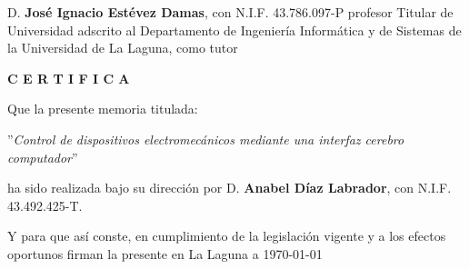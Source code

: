 \newpage
\thispagestyle{empty}

D. {\bf José Ignacio Estévez Damas}, con N.I.F. 43.786.097-P profesor Titular de Universidad adscrito al Departamento de Ingenier\'ia Inform\'atica y de Sistemas de la Universidad de La Laguna, como tutor


\bigskip
\bigskip
{\bf C E R T I F I C A}

\bigskip
\bigskip
Que la presente memoria titulada:

\bigskip
''{\it Control de dispositivos electromec\'anicos mediante una interfaz cerebro computador}''

\bigskip
\bigskip
\bigskip

\noindent ha sido realizada bajo su dirección por D. {\bf Anabel D\'iaz Labrador},
con N.I.F. 43.492.425-T.

\bigskip
\bigskip

Y para que así conste, en cumplimiento de la legislación vigente y a los efectos
oportunos firman la presente en La Laguna a \today